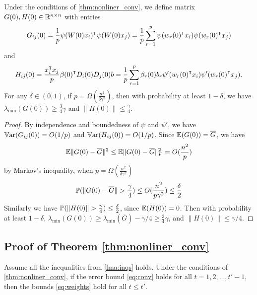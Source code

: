 \begin{lemma}
\label{lma:GH}
Under the conditions of \cref{thm:nonliner_conv}, we define matrix $G(0),H(0)\in\mathbb{R}^{n\times n}$ with entries
\begin{equation}
\label{eq:def_G0}
G_{ij}(0) = \frac{1}{p}\psi(W(0)x_i)\transpose \psi(W(0)x_j) = \frac{1}{p}\sum_{r=1}^p\psi(w_r(0)\transpose x_i)\psi(w_r(0)\transpose x_j)
\end{equation}
and
\begin{equation}
\label{eq:def_H0}
H_{ij}(0) = \frac{x_i\transpose x_j}{p}\beta(0)\transpose D_i(0)D_j(0)b = \frac{1}{p}\sum_{r=1}^p\beta_r(0)b_r\psi'(w_r(0)\transpose x_i)\psi'(w_r(0)\transpose x_j).
\end{equation}
For any $\delta \in (0,1)$, if $p=\Omega(\frac{n^2}{\delta\gamma^2})$, then with probability at least $1-\delta$, we have $\lambda_{\min}(G(0))\geq \frac{3}{4}\gamma$ and $\|H(0)\|\leq \frac{\gamma}{4}$.
\end{lemma}
\begin{proof}
By independence and boundedness of $\psi$ and $\psi'$, we have $\mathbb{V}\mathrm{ar}(G_{ij}(0)) = O(1/p)$ and $\mathbb{V}\mathrm{ar}(H_{ij}(0)) = O(1/p)$. Since $\mathbb{E}(G(0))=\overline{G}$, we have
\begin{equation*}
\mathbb{E}\|G(0)-\overline{G}\|^2 \leq \mathbb{E}\|G(0)-\overline{G}\|^2_F = O(\frac{n^2}{p})
\end{equation*}
by Markov's inequality, when $p=\Omega(\frac{n^2}{\delta\gamma^2})$
\begin{equation*}
    \prob(\|G(0)-\overline{G}\|>\frac{\gamma}{4})\leq O(\frac{n^2}{p\gamma^2})\leq\frac{\delta}{2}
\end{equation*}
Similarly we have $\prob(\|H(0)\|>\frac{\gamma}{4})\leq\frac{\delta}{2}$, since $\mathbb{E}(H(0))=0$. Then with probability at least $1-\delta$, $\lambda_{\min}(G(0)) \geq \lambda_{\min}(\overline{G}) -\gamma/4 \geq \frac{3}{4}\gamma$, and $\|H(0)\|\leq \gamma/4$.
\end{proof}

\subsection{Proof of Theorem \ref{thm:nonliner_conv}}

\begin{lemma}
\label{lma:weights}
Assume all the inequalities from \cref{lma:inqs} holds. Under the conditions of \cref{thm:nonliner_conv}, if the error bound \eqref{eq:conv} holds for all $t=1,2,...,t'-1$, then the bounds \eqref{eq:weights} hold for all $t\leq t'$.
\end{lemma}

